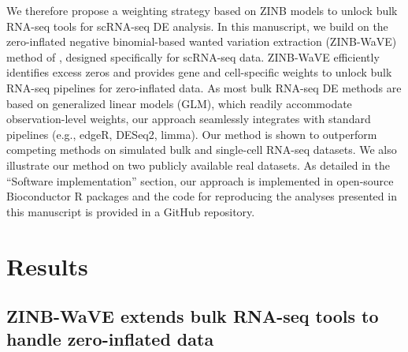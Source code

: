 \documentclass{bmcart}
\newcommand{\RPack}[1]{\textsf{#1}}
\newcommand{\lc}[1]{\textcolor{ao}{*** LC: #1}}
\begin{document}
We therefore propose a weighting strategy based on ZINB models to unlock bulk RNA-seq tools for scRNA-seq DE analysis. In this manuscript, we build on
the zero-inflated negative binomial-based wanted variation extraction (ZINB-WaVE) method of \citet{Risso2017}, designed specifically for scRNA-seq data. ZINB-WaVE efficiently identifies excess zeros and provides gene and cell-specific weights to unlock bulk RNA-seq pipelines for zero-inflated data. As most bulk RNA-seq DE methods are based on generalized linear models (GLM), which readily accommodate observation-level weights, our approach seamlessly integrates with standard pipelines (e.g., \RPack{edgeR}, \RPack{DESeq2}, \RPack{limma}). Our method is shown to outperform competing methods on simulated bulk and single-cell RNA-seq datasets. We also illustrate our method on two publicly available real datasets. As detailed in the ``Software implementation'' section, our approach is implemented in open-source Bioconductor R packages and the code for reproducing the analyses presented in this manuscript is provided in a GitHub repository. 


\section*{Results}

\subsection*{ZINB-WaVE extends bulk RNA-seq tools to handle zero-inflated data}
\end{document}
